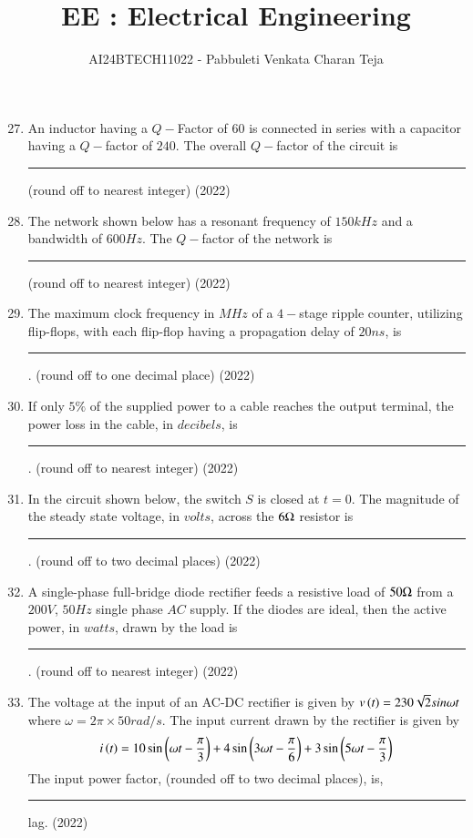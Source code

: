 \documentclass[journal]{IEEEtran}
\begin{document}

\vspace{3cm}

\title{EE : Electrical Engineering}
\author{AI24BTECH11022 - Pabbuleti Venkata Charan Teja}
\maketitle

\renewcommand{\thefigure}{\theenumi}
\renewcommand{\thetable}{\theenumi}


\begin{enumerate}
\setcounter{enumi}{26}
\item An inductor having a $Q-$Factor of $60$ is connected in series with a capacitor having a $Q-$factor of $240$. The overall $Q-$factor of the circuit is \rule{1cm}{0.15mm} (round off to nearest integer) \hfill(2022)


\item The network shown below has a resonant frequency of $150kHz$ and a bandwidth of $600Hz$. The $Q-$factor of the network is \rule{1cm}{0.15mm} (round off to nearest integer) \hfill(2022)




\item The maximum clock frequency in $MHz$ of a $4-$stage ripple counter, utilizing flip-flops, with each flip-flop having a propagation delay of $20ns$, is \rule{1cm}{0.15mm}. (round off to one decimal place) \hfill(2022)


\item If only $5\%$ of the supplied power to a cable reaches the output terminal, the power loss in the cable, in $decibels$, is \rule{1cm}{0.15mm}. (round off to nearest integer) \hfill(2022)


\item In the circuit shown below, the switch $S$ is closed at $t=0$. The magnitude of the steady state voltage, in $volts$, across the $6\ohm$ resistor is \rule{1cm}{0.15mm}. (round off to two decimal places) \hfill(2022)




\item A single-phase full-bridge diode rectifier feeds a resistive load of $50\ohm$ from a $200V$, $50Hz$ single phase $AC$ supply. If the diodes are ideal, then the active power, in $watts$, drawn by the load is \rule{1cm}{0.15mm}. (round off to nearest integer) \hfill(2022)


\item The voltage at the input of an AC-DC rectifier is given by $v\left(t\right)=230\sqrt{2}sin{\omega t}$ where $\omega=2\pi\times 50rad/s$. The input current drawn by the rectifier is given by $$i\left(t\right)=10\sin{\ensuremath{\left(\omega t-\frac{\pi}{3}\right)}}+4\sin{\ensuremath{\left(3\omega t-\frac{\pi}{6}\right)}}+3\sin{\ensuremath{\left(5\omega t-\frac{\pi}{3}\right)}}$$ The input power factor, (rounded off to two decimal places), is, \rule{1cm}{0.15mm} lag. \hfill(2022)



\end{enumerate}
\end{document}
